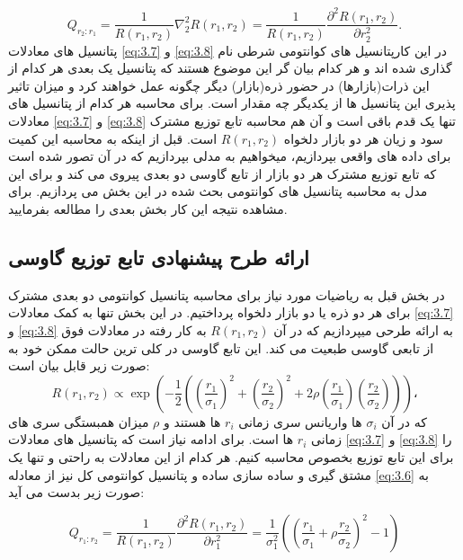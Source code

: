 \documentclass[a4paper,titlepage,12pt,fleqn,oneside]{report}
\begin{document}
	\begin{equation}
		Q_{r_2:r_1} =\frac{1}{R(r_1,r_2)} \nabla_2^2 R(r_{1},r_{2} ) =\frac{1}{R(r_1,r_2)} \frac{\partial^2 R(r_1,r_2)}{\partial r_2^2}.
		\label{eq:3.8}
	\end{equation}
	پتانسیل های معادلات 
	\ref{eq:3.7}
	و
	\ref{eq:3.8}
	در این کارپتانسیل های کوانتومی شرطی نام گذاری شده اند و هر کدام بیان گر این موضوع هستند که پتانسیل یک بعدی هر کدام از این ذرات(بازارها) در حضور ذره(بازار) دیگر چگونه عمل خواهند کرد و میزان تاثیر پذیری این پتانسیل ها از یکدیگر چه مقدار است.
	برای محاسبه هر کدام از پتانسیل های معادلات 
	\ref{eq:3.7}
	و
	\ref{eq:3.8}
	تنها یک قدم باقی است و آن هم محاسبه تابع توزیع مشترک سود و زیان هر دو بازار دلخواه
	$R(r_1,r_2)$
	است. قبل از اینکه به محاسبه این کمیت برای داده های واقعی بپردازیم، میخواهیم به مدلی بپردازیم که در آن تصور شده است که تابع توزیع مشترک هر دو بازار از تابع گاوسی دو بعدی پیروی می کند و برای این مدل به محاسبه پتانسیل های کوانتومی بحث شده در این بخش می پردازیم. برای مشاهده نتیجه این کار بخش بعدی را مطالعه بفرمایید.
	\subsection{ارائه طرح پیشنهادی تابع توزیع گاوسی}
	در بخش قبل به ریاضیات مورد نیاز برای محاسبه پتانسیل کوانتومی دو بعدی مشترک برای هر دو ذره یا دو بازار دلخواه پرداختیم. در این بخش تنها به کمک معادلات
	\ref{eq:3.7}
	و
	\ref{eq:3.8}
	به ارائه طرحی میپردازیم که در آن 
	$R(r_1,r_2)$
	به کار رفته در معادلات فوق از تابعی گاوسی طبعیت می کند. این  تابع گاوسی در کلی ترین حالت ممکن خود به صورت زیر قابل بیان است:
	\begin{equation}
		R(r_1,r_2) \propto \exp\left( -\frac{1}{2} \left( (\frac{r_1}{\sigma_1})^2 + (\frac{r_2}{\sigma_2})^2 +2\rho(\frac{r_1}{\sigma_1})(\frac{r_2}{\sigma_2})\right)\right)،
		\label{eq:3.9}
	\end{equation}
	که در آن 
	$\sigma_i$
	ها واریانس سری زمانی 
	$r_i$
	ها هستند و 
	$\rho$
	میزان همبستگی سری های زمانی 
	$r_i$
	ها است.
	برای ادامه نیاز است که پتانسیل های معادلات 
	\ref{eq:3.7}
	و
	\ref{eq:3.8}
	را برای این تابع توزیع بخصوص محاسبه کنیم.
	هر کدام از این معادلات به راحتی و تنها یک مشتق گیری و ساده سازی ساده و پتانسیل کوانتومی کل نیز از معادله 
	\ref{eq:3.6}
	به صورت زیر بدست می آید:
	
	\begin{equation}
		Q_{r_1:r_2} = \frac{1}{R(r_1,r_2)} \frac{\partial^2 R(r_1,r_2)}{\partial r_1^2} = \frac{1}{\sigma_1^2}\left(\left(\frac{r_1}{\sigma_1} + \rho\frac{r_2}{\sigma_2}\right)^2-1\right)
		\label{eq:3.10}
	\end{equation}
	
\end{document}
